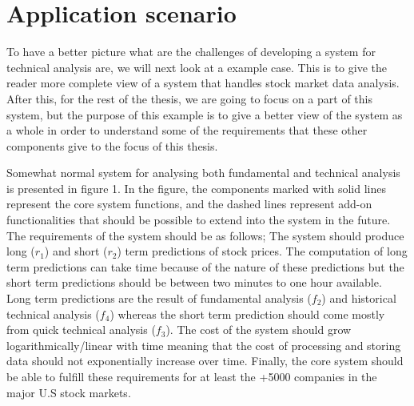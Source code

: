 \section{Application scenario}

To have a better picture what are the challenges of developing a system for technical analysis are, we will next look at a example case.
This is to give the reader more complete view of a system that handles stock market data analysis.
After this, for the rest of the thesis, we are going to focus on a part of this system, but the purpose of this example is to give a better view of the system as a whole in order to understand some of the requirements that these other components give to the focus of this thesis.

Somewhat normal system for analysing both fundamental and technical analysis is presented in figure 1.
In the figure, the components marked with solid lines represent the core system functions, and the dashed lines represent add-on functionalities that should be possible to extend into the system in the future.
The requirements of the system should be as follows;
The system should produce long ($r_1$) and short ($r_2$) term predictions of stock prices.
The computation of long term predictions can take time because of the nature of these predictions but the short term predictions should be between two minutes to one hour available.
Long term predictions are the result of fundamental analysis ($f_2$) and historical technical analysis ($f_4$) whereas the short term prediction should come mostly from quick technical analysis ($f_3$).
The cost of the system should grow logarithmically/linear with time meaning that the cost of processing and storing data should not exponentially increase over time.
Finally, the core system should be able to fulfill these requirements for at least the +5000 companies in the major U.S stock markets.

